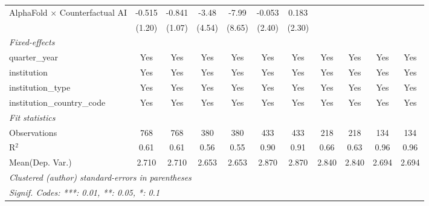 \begin{tabular}{lcccccccccc}
   AlphaFold $\times$ Counterfactual AI  & -0.515 & -0.841  & -3.48       & -7.99   & -0.053 & 0.183   &        &        &              &   \\   
                                         & (1.20) & (1.07)  & (4.54)      & (8.65)  & (2.40) & (2.30)  &        &        &              &   \\   
   \midrule
   \emph{Fixed-effects}\\
   quarter\_year                         & Yes    & Yes     & Yes         & Yes     & Yes    & Yes     & Yes    & Yes    & Yes          & Yes\\  
   institution                           & Yes    & Yes     & Yes         & Yes     & Yes    & Yes     & Yes    & Yes    & Yes          & Yes\\  
   institution\_type                     & Yes    & Yes     & Yes         & Yes     & Yes    & Yes     & Yes    & Yes    & Yes          & Yes\\  
   institution\_country\_code            & Yes    & Yes     & Yes         & Yes     & Yes    & Yes     & Yes    & Yes    & Yes          & Yes\\  
   \midrule
   \emph{Fit statistics}\\
   Observations                          & 768    & 768     & 380         & 380     & 433    & 433     & 218    & 218    & 134          & 134\\  
   R$^2$                                 & 0.61   & 0.61    & 0.56        & 0.55    & 0.90   & 0.91    & 0.66   & 0.63   & 0.96         & 0.96\\  
Mean(Dep. Var.) & 2.710 & 2.710 & 2.653 & 2.653 & 2.870 & 2.870 & 2.840 & 2.840 & 2.694 & 2.694 \\
   \midrule \midrule
   \multicolumn{11}{l}{\emph{Clustered (author) standard-errors in parentheses}}\\
   \multicolumn{11}{l}{\emph{Signif. Codes: ***: 0.01, **: 0.05, *: 0.1}}\\
\end{tabular}
\par\endgroup
